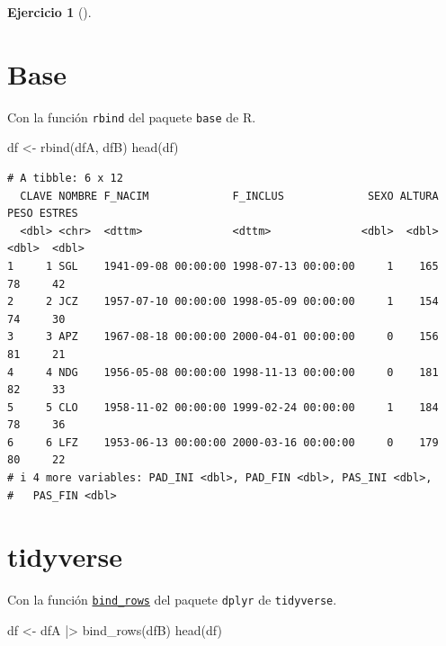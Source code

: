 \documentclass[
  a4paper,
]{scrreport}
\newenvironment{Shaded}{\begin{snugshade}}{\end{snugshade}}
\newcommand{\FunctionTok}[1]{\textcolor[rgb]{0.28,0.35,0.67}{#1}}
\newcommand{\NormalTok}[1]{\textcolor[rgb]{0.00,0.23,0.31}{#1}}
\newcommand{\OtherTok}[1]{\textcolor[rgb]{0.00,0.23,0.31}{#1}}
\newcommand{\SpecialCharTok}[1]{\textcolor[rgb]{0.37,0.37,0.37}{#1}}
\theoremstyle{definition}
\newtheorem{exercise}{Ejercicio}[chapter]
\theoremstyle{remark}
\begin{document}
\begin{exercise}[]
\begin{enumerate}
\begin{tcolorbox}
  \section{Base}

  Con la función \texttt{rbind} del paquete \texttt{base} de R.

\begin{Shaded}
\begin{Highlighting}[]
\NormalTok{df }\OtherTok{\textless{}{-}} \FunctionTok{rbind}\NormalTok{(dfA, dfB)}
\FunctionTok{head}\NormalTok{(df)}
\end{Highlighting}
\end{Shaded}

\begin{verbatim}
# A tibble: 6 x 12
  CLAVE NOMBRE F_NACIM             F_INCLUS             SEXO ALTURA  PESO ESTRES
  <dbl> <chr>  <dttm>              <dttm>              <dbl>  <dbl> <dbl>  <dbl>
1     1 SGL    1941-09-08 00:00:00 1998-07-13 00:00:00     1    165    78     42
2     2 JCZ    1957-07-10 00:00:00 1998-05-09 00:00:00     1    154    74     30
3     3 APZ    1967-08-18 00:00:00 2000-04-01 00:00:00     0    156    81     21
4     4 NDG    1956-05-08 00:00:00 1998-11-13 00:00:00     0    181    82     33
5     5 CLO    1958-11-02 00:00:00 1999-02-24 00:00:00     1    184    78     36
6     6 LFZ    1953-06-13 00:00:00 2000-03-16 00:00:00     0    179    80     22
# i 4 more variables: PAD_INI <dbl>, PAD_FIN <dbl>, PAS_INI <dbl>,
#   PAS_FIN <dbl>
\end{verbatim}

  \section{tidyverse}

  Con la función
  \href{https://dplyr.tidyverse.org/reference/bind.html}{\texttt{bind\_rows}}
  del paquete \texttt{dplyr} de \texttt{tidyverse}.

\begin{Shaded}
\begin{Highlighting}[]
\NormalTok{df }\OtherTok{\textless{}{-}}\NormalTok{ dfA }\SpecialCharTok{|\textgreater{}} \FunctionTok{bind\_rows}\NormalTok{(dfB)}
\FunctionTok{head}\NormalTok{(df)}
\end{Highlighting}
\end{Shaded}


\end{tcolorbox}
\end{enumerate}
\end{exercise}
\end{document}
